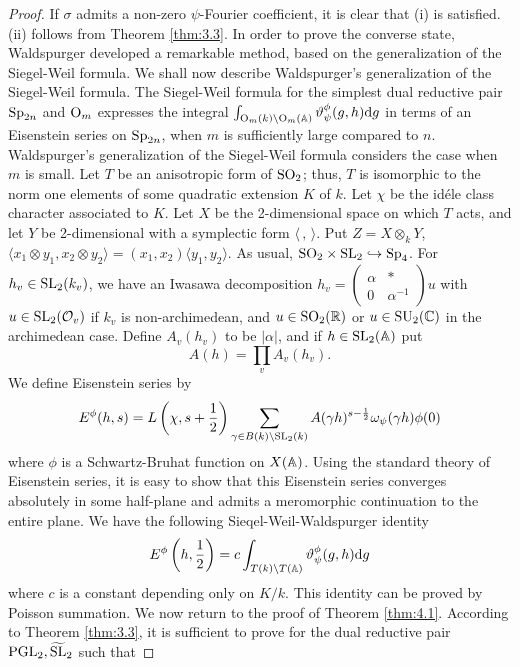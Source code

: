 \begin{proof}
If $\sigma$ admits a non-zero $\psi$-Fourier coefficient, it is clear that (i) is satisfied.
(ii) follows from Theorem \ref{thm:3.3}.
In order to prove the converse state, Waldspurger developed a remarkable method, based on the generalization of the Siegel-Weil formula.
We shall now describe Waldspurger's generalization of the Siegel-Weil formula.
The Siegel-Weil formula for the simplest dual reductive pair $\mathrm{Sp}_{2n}$ and $\mathrm{O}_{m}$ expresses the integral $\int_{\mathrm{O}_{m}(k) \backslash \mathrm{O}_{m}(\mathbb{A})} \vartheta_\psi^\phi(g, h) \mathrm{d} g$
in terms of an Eisenstein series on $\mathrm{Sp}_{2n}$, when $m$ is sufficiently large compared to $n$.
Waldspurger's generalization of the Siegel-Weil formula considers the case when $m$ is small.
Let $T$ be an anisotropic form of $\mathrm{SO}_2$; thus, $T$ is isomorphic to the norm one elements of some quadratic extension $K$ of $k$.
Let $\chi$ be the id\'ele class character associated to $K$. 
Let $X$ be the 2-dimensional space on which $T$ acts, and let $Y$ be 2-dimensional with a symplectic form $\langle \,,\,\rangle$.
Put $Z = X \otimes_k Y$, $\langle x_1 \otimes y_1, x_2 \otimes y_2 \rangle = (x_1, x_2) \langle y_1, y_2 \rangle$.
As usual, $\mathrm{SO}_2 \times \mathrm{SL}_2 \hookrightarrow \mathrm{Sp}_4$.
For $h_v \in \mathrm{SL}_2(k_v)$, we have an Iwasawa decomposition $h_v = \left(\begin{smallmatrix}
    \alpha & * \\ 0 & \alpha^{-1}
\end{smallmatrix}\right) u$ with $u \in \mathrm{SL}_2(\mathcal{O}_v)$ if $k_v$ is non-archimedean, and $u \in \mathrm{SO}_2(\mathbb{R})$ or $u \in \mathrm{SU}_2(\mathbb{C})$ in the archimedean case.
Define $A_v(h_v)$ to be $|\alpha|$, and if $h \in \mathrm{SL}_2(\mathbb{A})$ put
\[
A(h) = \prod_v A_v(h_v).
\]
We define Eisenstein series by
\[
E^\phi(h, s) = L\left(\chi, s + \frac{1}{2}\right) \sum_{\gamma \in B(k) \backslash \mathrm{SL}_2(k)} A(\gamma h)^{s - \frac{1}{2}}\omega_\psi(\gamma h)\phi(0)
\]
where $\phi$ is a Schwartz-Bruhat function on $X(\mathbb{A})$.
Using the standard theory of Eisenstein series, it is easy to show that this Eisenstein series converges absolutely in some half-plane and admits a meromorphic continuation to the entire plane.
We have the following Sieqel-Weil-Waldspurger identity
\[
E^\phi\left(h, \frac{1}{2}\right) = c \int_{T(k) \backslash T(\mathbb{A})} \vartheta_\psi^\phi(g, h) \mathrm{d} g
\]
where $c$ is a constant depending only on $K/k$. This identity can be proved by Poisson summation.
We now return to the proof of Theorem \ref{thm:4.1}.
According to Theorem \ref{thm:3.3}, it is sufficient to prove for the dual reductive pair $\mathrm{PGL}_2, \widetilde{\mathrm{SL}}_2$ such that

\end{proof}

